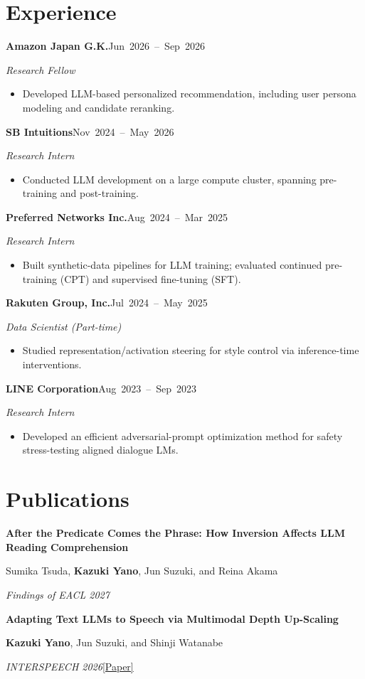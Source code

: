 \documentclass[a4paper,11pt]{article}
\newcommand{\roleline}[3]{%
  \par\addvspace{5pt}\Needspace{4\baselineskip}%
  \noindent\textbf{#1}\hfill\mbox{\small #3}\par\nobreak
  {\itshape #2\par}\nobreak}
\newcommand{\publication}[4]{%
  \par\addvspace{5pt}%
  \begin{minipage}{\linewidth}\RaggedRight
    {\bfseries #1\par}
    {\small #2\par}
    {\small\textit{#3}\quad #4\par}
  \end{minipage}\par}
\begin{document}
\section{Experience}
\roleline{Amazon Japan G.K.}{Research Fellow}{Jun 2026 -- Sep 2026}
\begin{itemize}
\item Developed LLM-based personalized recommendation, including user persona modeling and candidate reranking.
\end{itemize}
\roleline{SB Intuitions}{Research Intern}{Nov 2024 -- May 2026}
\begin{itemize}
\item Conducted LLM development on a large compute cluster, spanning pre-training and post-training.
\end{itemize}
\roleline{Preferred Networks Inc.}{Research Intern}{Aug 2024 -- Mar 2025}
\begin{itemize}
\item Built synthetic-data pipelines for LLM training; evaluated continued pre-training (CPT) and supervised fine-tuning (SFT).
\end{itemize}
\roleline{Rakuten Group, Inc.}{Data Scientist (Part-time)}{Jul 2024 -- May 2025}
\begin{itemize}
\item Studied representation/activation steering for style control via inference-time interventions.
\end{itemize}
\roleline{LINE Corporation}{Research Intern}{Aug 2023 -- Sep 2023}
\begin{itemize}
\item Developed an efficient adversarial-prompt optimization method for safety stress-testing aligned dialogue LMs.
\end{itemize}

\section{Publications}
\publication{After the Predicate Comes the Phrase: How Inversion Affects LLM Reading Comprehension}
{Sumika Tsuda, \textbf{Kazuki Yano}, Jun Suzuki, and Reina Akama}
{Findings of EACL 2027}{}
\publication{Adapting Text LLMs to Speech via Multimodal Depth Up-Scaling}
{\textbf{Kazuki Yano}, Jun Suzuki, and Shinji Watanabe}
{INTERSPEECH 2026}{\href{https://arxiv.org/abs/2604.00489}{[Paper]}}
\newpage
\end{document}
